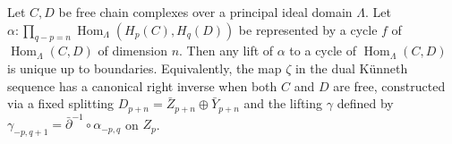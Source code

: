 Let $C, D$ be free chain complexes over a principal ideal domain $\Lambda$. Let $\alpha : \prod_{q-p=n} \operatorname{Hom}_\Lambda(H_p(C), H_q(D))$ be represented by a cycle $f$ of $\operatorname{Hom}_\Lambda(C, D)$ of dimension $n$. Then any lift of $\alpha$ to a cycle of $\operatorname{Hom}_\Lambda(C, D)$ is unique up to boundaries. Equivalently, the map $\zeta$ in the dual Künneth sequence has a canonical right inverse when both $C$ and $D$ are free, constructed via a fixed splitting $D_{p+n} = \bar{Z}_{p+n} \oplus \bar{Y}_{p+n}$ and the lifting $\gamma$ defined by $\gamma_{-p,q+1} = \bar{\partial}^{-1} \circ \alpha_{-p,q}$ on $Z_p$.

